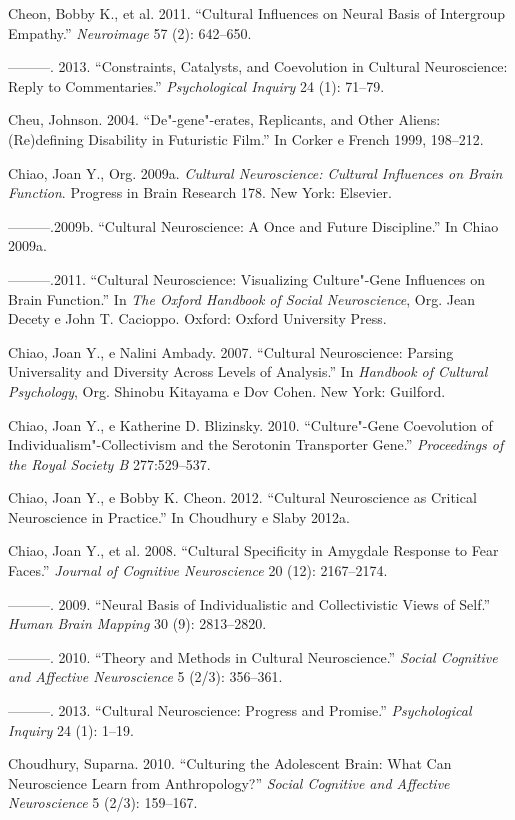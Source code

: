 Cheon, Bobby K., et al. 2011. ``Cultural Influences on Neural Basis of
Intergroup Empathy.'' \emph{Neuroimage} 57 (2): 642--650.

---------. 2013. ``Constraints, Catalysts, and Coevolution in Cultural
Neuroscience: Reply to Commentaries.'' \emph{Psychological Inquiry} 24
(1): 71--79.

Cheu, Johnson. 2004. ``De"-gene"-erates, Replicants, and Other Aliens:
(Re)defining Disability in Futuristic Film.'' In Corker e French 1999,
198--212.

Chiao, Joan Y., Org. 2009a. \emph{Cultural Neuroscience: Cultural
Influences on Brain Function}. Progress in Brain Research 178. New York:
Elsevier.

---------.2009b. ``Cultural Neuroscience: A Once and Future
Discipline.'' In Chiao 2009a.

---------.2011. ``Cultural Neuroscience: Visualizing Culture"-Gene
Influences on Brain Function.'' In \emph{The Oxford Handbook of Social
Neuroscience}, Org. Jean Decety e John T. Cacioppo. Oxford: Oxford
University Press.

Chiao, Joan Y., e Nalini Ambady. 2007. ``Cultural Neuroscience: Parsing
Universality and Diversity Across Levels of Analysis.'' In
\emph{Handbook of Cultural Psychology}, Org. Shinobu Kitayama e Dov
Cohen. New York: Guilford.

Chiao, Joan Y., e Katherine D. Blizinsky. 2010. ``Culture"-Gene
Coevolution of Individualism"-Collectivism and the Serotonin Transporter
Gene.'' \emph{Proceedings of the Royal Society B} 277:529--537.

Chiao, Joan Y., e Bobby K. Cheon. 2012. ``Cultural Neuroscience as
Critical Neuroscience in Practice.'' In Choudhury e Slaby 2012a.

Chiao, Joan Y., et al. 2008. ``Cultural Specificity in Amygdale Response
to Fear Faces.'' \emph{Journal of Cognitive Neuroscience} 20 (12):
2167--2174.

---------. 2009. ``Neural Basis of Individualistic and Collectivistic
Views of Self.'' \emph{Human Brain Mapping} 30 (9): 2813--2820.

---------. 2010. ``Theory and Methods in Cultural Neuroscience.''
\emph{Social Cognitive and Affective Neuroscience} 5 (2/3): 356--361.

---------. 2013. ``Cultural Neuroscience: Progress and Promise.''
\emph{Psychological Inquiry} 24 (1): 1--19.

Choudhury, Suparna. 2010. ``Culturing the Adolescent Brain: What Can
Neuroscience Learn from Anthropology?'' \emph{Social Cognitive and
Affective Neuroscience} 5 (2/3): 159--167.

